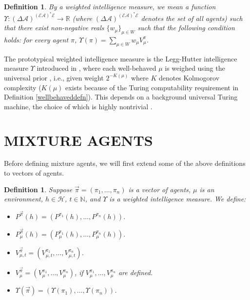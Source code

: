 \documentclass[twoside]{article}
\newtheorem{definition}[theorem]{Definition}
\begin{document}
\begin{definition}
\label{performanceaveragerdefn}
    By a \emph{weighted intelligence measure}, we mean a function
    $
        \Upsilon:
        (\Delta\mathcal A)^{(\mathcal E\mathcal A)^*\mathcal E}
        \to
        \mathbb R
    $
    (where
    $(\Delta\mathcal A)^{(\mathcal E\mathcal A)^*\mathcal E}$ denotes the set of all agents)
    such that there exist non-negative reals $\{w_\mu\}_{\mu\in W}$ such that the following
    condition holds:
    for every agent $\pi$, $\Upsilon(\pi)=\sum_{\mu\in W}w_\mu V^\pi_\mu$.
\end{definition}

The prototypical weighted intelligence measure is the Legg-Hutter intelligence
measure $\Upsilon$ introduced in \cite{legg2007universal},
where each well-behaved $\mu$ is
weighed using the universal prior \cite{li2008introduction}, i.e.,
given weight $2^{-K(\mu)}$
where $K$ denotes Kolmogorov complexity ($K(\mu)$ exists because of the Turing
computability requirement in Definition \ref{wellbehaveddefn}).
This depends on a background universal
Turing machine, the choice of which is highly nontrivial
\cite{leike2015bad}.

\section{MIXTURE AGENTS}

Before defining mixture agents, we will first extend some of the above
definitions to vectors of agents.

\begin{definition}
\label{vectorizationdefn}
    Suppose $\vec\pi=(\pi_1,\ldots,\pi_n)$ is a vector of agents, $\mu$ is an environment,
    $h\in\mathcal H$, $t\in\mathbb N$, and $\Upsilon$ is a weighted
    intelligence measure. We define:
    \begin{itemize}
        \item ${P^{\vec\pi}}(h)=(P^{\pi_1}(h),\ldots,P^{\pi_n}(h))$.
        \item $P^{\vec\pi}_\mu(h)=(P^{\pi_1}_\mu(h),\ldots,P^{\pi_n}_\mu(h))$.
        \item $V^{\vec\pi}_{\mu,t}=(V^{\pi_1}_{\mu,t},\ldots,V^{\pi_n}_{\mu,t})$.
        \item $V^{\vec\pi}_\mu=(V^{\pi_1}_\mu,\ldots,V^{\pi_n}_\mu)$,
            if $V^{\pi_1}_\mu,\ldots,V^{\pi_n}_\mu$ are defined.
        \item $\Upsilon(\vec\pi)=(\Upsilon(\pi_1),\ldots,\Upsilon(\pi_n))$.
    \end{itemize}
\end{definition}
\end{document}
